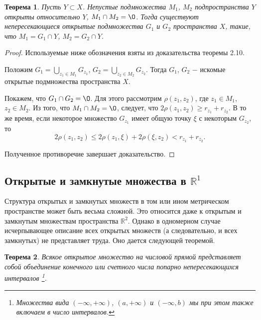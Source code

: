 \documentclass{article}
\newtheorem{theorem}{Теорема}[section]
\begin{document}
\begin{theorem}
Пусть \(Y \subset X\). Непустые подмножества \(M_1\), \(M_2\) подпространства \(Y\) открыты относительно \(Y\), \(M_1 \cap M_2 = \O\). Тогда существуют непересекающиеся открытые подмножества \(G_1\) и \(G_2\) пространства \(X\), такие, что \(M_1 = G_1 \cap Y\), \(M_2 = G_2 \cap Y\).
\end{theorem}

\begin{proof}
Используемые ниже обозначения взяты из доказательства теоремы 2.10.

Положим \(G_1 = \bigcup\limits_{z_1 \in M_1} G_{z_1}\), \(G_2 = \bigcup\limits_{z_2 \in M_2} G_{z_2}\). Тогда \(G_1\), \(G_2\) \(-\) искомые открытые подмножества пространства \(X\).

Покажем, что \(G_1 \cap G_2 = \O\). Для этого рассмотрим \(\rho(z_1, z_2)\), где \(z_1 \in M_1\), \(z_2 \in M_2\). Из того, что \(M_1 \cap M_2 = \O\), следует, что \(2\rho(z_1, z_2) \geq r_{z_1} + r_{z_2}\). В то же время, если некоторое множество \(G_{z_1}\) имеет общую точку \(\xi\) с некоторым \(G_{z_2}\), то
\[
2\rho(z_1, z_2) \leq 2\rho(z_1, \xi) + 2\rho(\xi, z_2) < r_{z_1} + r_{z_2}.
\]

Полученное противоречие завершает доказательство.
\end{proof}

\subsection{Открытые и замкнутые множества в \(\mathbb{R}^1\)}

Структура открытых и замкнутых множеств в том или ином метрическом пространстве может быть весьма сложной. Это относится даже к открытым и замкнутым множествам пространства \(\mathbb{R}^2\). Однако в одномерном случае исчерпывающее описание всех открытых множеств (а следовательно, и всех замкнутых) не представляет труда. Оно дается следующей теоремой.

\begin{theorem}
Всякое открытое множество на числовой прямой представляет собой объединение конечного или счетного числа попарно непересекающихся интервалов
\footnote[1]
{
Множества вида \((- \infty, +\infty)\), \((a, +\infty)\) и \((- \infty, b)\) мы при этом также включаем в число интервалов.
}.
\end{theorem}
\end{document}

